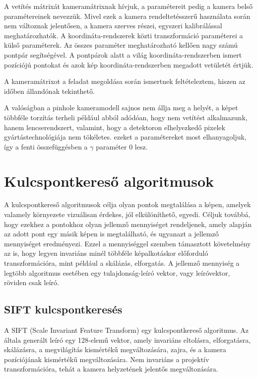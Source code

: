 \documentclass{article}
\begin{document}
A vetítés mátrixát kameramátrixnak hívjuk, a paramétereit pedig a kamera belső paramétereinek nevezzük. Mivel ezek a kamera rendeltetésszerű használata során nem változnak jelentősen, a kamera szerves részei, egyszeri kalibrálással meghatározhatók. A koordináta-rendszerek közti transzformáció paraméterei a külső paraméterek. Az összes paraméter meghatározható kellően nagy számú pontpár segítségével. A pontpárok alatt a világ koordináta-rendszerben ismert pozíciójú pontokat és azok kép koordináta-rendszerben megadott vetületét értjük.

A kameramátrixot a feladat megoldása során ismertnek feltételeztem, hiszen az időben állandónak tekinthető.

A valóságban a pinhole kameramodell sajnos nem állja meg a helyét, a képet többféle torzítás terheli például abból adódóan, hogy nem vetítést alkalmazunk, hanem lencserendszert, valamint, hogy a detektoron elhelyezkedő pixelek gyártástechnológiája nem tökéletes. ezeket a paramétereket most elhanyagoljuk, így a fenti összefüggésben a $\gamma$ paraméter 0 lesz.

		
	\newpage
	\section{Kulcspontkereső algoritmusok}
	
	A kulcspontkereső algoritmusok célja olyan pontok megtalálása a képen, amelyek valamely környezete vizuálisan érdekes, jól elkülöníthető, egyedi. Céljuk továbbá, hogy ezekhez a pontokhoz olyan jellemző mennyiséget rendeljenek, amely alapján az adott pont egy másik képen is megtalálható, és ugyanazt a jellemző mennyiséget eredményezi. Ezzel a mennyiséggel szemben támasztott követelmény az is, hogy legyen invariáns minél többféle képalkotáskor előforduló transzformációra, mint például a skálázás, elforgatás. A jellemző mennyiség a legtöbb algoritmus esetében egy tulajdonság-leíró vektor, vagy leíróvektor, röviden csak leíró.
	
	\subsection{SIFT kulcspontkeresés}
	
	A SIFT (Scale Invariant Feature Transform) egy kulcspontkereső algoritmus. Az általa generált leíró egy 128-elemű vektor, amely invariáns eltolásra, elforgatásra, skálázásra, a megvilágítás kismértékű megváltozására, zajra, és a kamera pozíciójának kismértékű megváltozására. Nem invariáns a projektív transzformációra, tehát a kamera helyzetének jelentős megváltozására.
	
\end{document}
